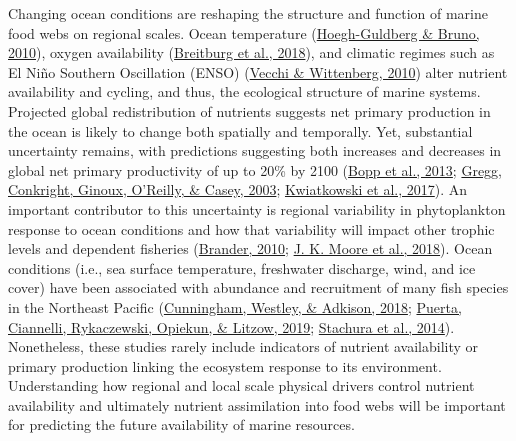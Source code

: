 \documentclass [11pt, proquest] {uwthesis}[2015/03/03]
\begin{document}
Changing ocean conditions are reshaping the structure and function of marine food webs on regional scales. Ocean temperature (\protect\hyperlink{ref-Hoegh2010}{Hoegh-Guldberg \& Bruno, 2010}), oxygen availability (\protect\hyperlink{ref-Brietburg2018}{Breitburg et al., 2018}), and climatic regimes such as El Niño Southern Oscillation (ENSO) (\protect\hyperlink{ref-Vecchi2010}{Vecchi \& Wittenberg, 2010}) alter nutrient availability and cycling, and thus, the ecological structure of marine systems. Projected global redistribution of nutrients suggests net primary production in the ocean is likely to change both spatially and temporally. Yet, substantial uncertainty remains, with predictions suggesting both increases and decreases in global net primary productivity of up to 20\% by 2100 (\protect\hyperlink{ref-Bopp2013}{Bopp et al., 2013}; \protect\hyperlink{ref-Gregg2003}{Gregg, Conkright, Ginoux, O'Reilly, \& Casey, 2003}; \protect\hyperlink{ref-Kwiatkowski2017}{Kwiatkowski et al., 2017}). An important contributor to this uncertainty is regional variability in phytoplankton response to ocean conditions and how that variability will impact other trophic levels and dependent fisheries (\protect\hyperlink{ref-Brander2010}{Brander, 2010}; \protect\hyperlink{ref-Moore2018}{J. K. Moore et al., 2018}). Ocean conditions (i.e., sea surface temperature, freshwater discharge, wind, and ice cover) have been associated with abundance and recruitment of many fish species in the Northeast Pacific (\protect\hyperlink{ref-Cunningham2018}{Cunningham, Westley, \& Adkison, 2018}; \protect\hyperlink{ref-Puerta2019}{Puerta, Ciannelli, Rykaczewski, Opiekun, \& Litzow, 2019}; \protect\hyperlink{ref-Stachura2014}{Stachura et al., 2014}). Nonetheless, these studies rarely include indicators of nutrient availability or primary production linking the ecosystem response to its environment. Understanding how regional and local scale physical drivers control nutrient availability and ultimately nutrient assimilation into food webs will be important for predicting the future availability of marine resources.
\end{document}
